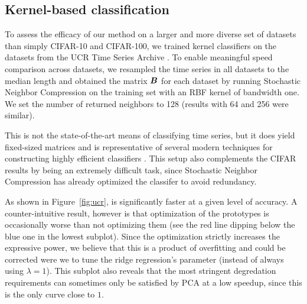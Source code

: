 \subsection{Kernel-based classification}

To assess the efficacy of our method on a larger and more diverse set of datasets than simply CIFAR-10 and CIFAR-100, we trained kernel classifiers on the datasets from the UCR Time Series Archive \cite{UCRArchive2018}. To enable meaningful speed comparison across datasets, we resampled the time series in all datasets to the median length and obtained the matrix $\bm{B}$ for each dataset by running Stochastic Neighbor Compression \cite{snc} on the training set with an RBF kernel of bandwidth one. We set the number of returned neighbors to 128 (results with 64 and 256 were similar).

This is not the state-of-the-art means of classifying time series, but it does yield fixed-sized matrices and is representative of several modern techniques for constructing highly efficient classifiers \cite{snc,dsnc,bnc,protonn}. This setup also complements the CIFAR results by being an extremely difficult task, since Stochastic Neighbor Compression has already optimized the classifer to avoid redundancy. %

As shown in Figure~\ref{fig:ucr}, \oursp is significantly faster at a given level of accuracy. A counter-intuitive result, however is that optimization of the prototypes is occasionally worse than not optimizing them (see the red line dipping below the blue one in the lowest subplot). Since the optimization strictly increases the expressive power, we believe that this is a product of overfitting and could be corrected were we to tune the ridge regression's parameter (instead of always using $\lambda = 1$). This subplot also reveals that the most stringent degredation requirements can sometimes only be satisfied by PCA at a low speedup, since this is the only curve close to $1$.

